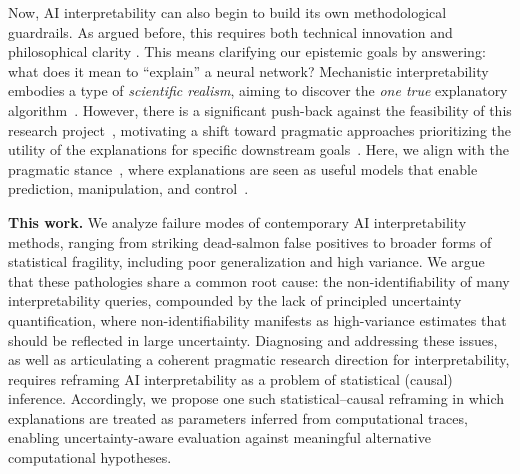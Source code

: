 Now, AI interpretability can also begin to build its own methodological guardrails. As argued before, this requires both technical innovation and philosophical clarity \citep{miller2019explanation,williams2025mechanisticinterpretabilityneedsphilosophy}. This means clarifying our epistemic goals by answering: what does it mean to ``explain'' a neural network? \citep{lillicrap2019doesmeanunderstandneural,lipton2018mythos} Mechanistic interpretability embodies a type of \textit{scientific realism}, aiming to discover the \textit{one true} explanatory algorithm~\citep{psillos2005scientific,chakravartty2011scientific}. However, there is a significant push-back against the feasibility of this research project~\citep{rudin2019stop,P_ez_2019,saphra2024mechanistic}, motivating a shift toward pragmatic approaches prioritizing the utility of the explanations for specific downstream goals~\citep{zou2025representationengineeringtopdownapproach}. Here, we align with the pragmatic stance~\citep{Dewey1948-DEWRIP,chang2004inventing,potochnik2017idealization}, where explanations are seen as useful models that enable prediction, manipulation, and control~\citep{van1980scientific,cartwright1983laws}. 

\textbf{This work.} We analyze failure modes of contemporary AI interpretability methods, ranging from striking dead-salmon false positives to broader forms of statistical fragility, including poor generalization and high variance. We argue that these pathologies share a common root cause: the non-identifiability of many interpretability queries, compounded by the lack of principled uncertainty quantification, where non-identifiability manifests as high-variance estimates that should be reflected in large uncertainty. Diagnosing and addressing these issues, as well as articulating a coherent pragmatic research direction for interpretability, requires reframing AI interpretability as a problem of statistical (causal) inference. Accordingly, we propose one such statistical–causal reframing in which explanations are treated as parameters inferred from computational traces, enabling uncertainty-aware evaluation against meaningful alternative computational hypotheses.



